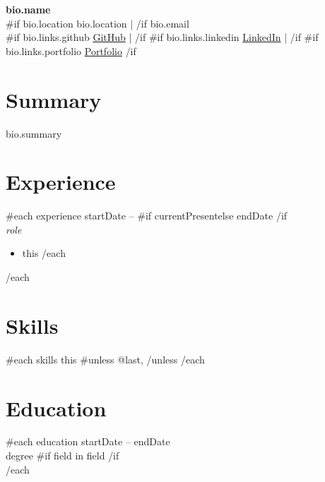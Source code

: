 \documentclass[11pt,a4paper]{article}
\begin{document}
\begin{center}
    {\huge \bfseries {{ bio.name }} } \\
    {{#if bio.location}}{{ bio.location }} | {{/if}} {{ bio.email }} \\
    {{#if bio.links.github}} \href{ {{ bio.links.github }} }{GitHub} | {{/if}}
    {{#if bio.links.linkedin}} \href{ {{ bio.links.linkedin }} }{LinkedIn} | {{/if}}
    {{#if bio.links.portfolio}} \href{ {{ bio.links.portfolio }} }{Portfolio} {{/if}}
\end{center}

\section*{Summary}
{{bio.summary}}

\section*{Experience}
{{#each experience}}
 \hfill {{ startDate }} -- {{#if current}}Present{{else}}{{ endDate }}{{/if}} \\
{\itshape {{ role }} } \\
\begin{itemize}[noitemsep,topsep=0pt]
    {{#each highlights}}
    \item {{ this }}
    {{/each}}
\end{itemize}
\vspace{6pt}
{{/each}}

\section*{Skills}
{{#each skills}}
{{ this }}{{#unless @last}}, {{/unless}}
{{/each}}

\section*{Education}
{{#each education}}
 \hfill {{ startDate }} -- {{ endDate }} \\
{{ degree }}{{#if field}} in {{ field }}{{/if}} \\
\vspace{6pt}
{{/each}}
\end{document}
